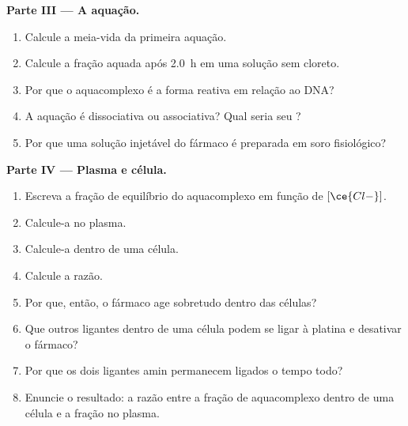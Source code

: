 \begin{problem}
\medskip\noindent\textbf{Parte III --- A aquação.}
\begin{enumerate}[resume]
  \item Calcule a meia-vida da primeira aquação.
  \item Calcule a fração aquada após \qty{2.0}{h} em uma solução sem cloreto.
  \item Por que o aquacomplexo é a forma reativa em relação ao DNA?
  \item A aquação é dissociativa ou associativa? Qual seria seu ?
  \item Por que uma solução injetável do fármaco é preparada em soro fisiológico?
\end{enumerate}

\medskip\noindent\textbf{Parte IV --- Plasma e célula.}
\begin{enumerate}[resume]
  \item Escreva a fração de equilíbrio do aquacomplexo em função de
        $[\ce{Cl-}]$.
  \item Calcule-a no plasma.
  \item Calcule-a dentro de uma célula.
  \item Calcule a razão.
  \item Por que, então, o fármaco age sobretudo dentro das células?
  \item Que outros ligantes dentro de uma célula podem se ligar à platina e desativar o
        fármaco?
  \item Por que os dois ligantes amin permanecem ligados o tempo todo?
  \item Enuncie o resultado: a razão entre a fração de aquacomplexo dentro de uma célula e
        a fração no plasma.
\end{enumerate}
\end{problem}
